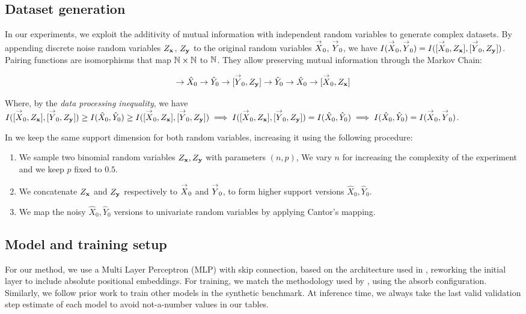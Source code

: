 \subsection{Dataset generation}\label{sec:isomorphisms}
In our experiments, we exploit the additivity of mutual information with independent random variables to generate complex datasets. By appending discrete noise random variables $Z_{\mathbf{x}}$, $Z_{\mathbf{y}}$ to the original random variables $\overset{\rightarrow}{X}_0$, $\overset{\rightarrow}{Y}_0$, we have $I(\overset{\rightarrow}{X}_0,\overset{\rightarrow}{Y}_0) = I([\overset{\rightarrow}{X}_0, Z_{\mathbf{x}}],[\overset{\rightarrow}{Y}_0, Z_{\mathbf{y}}])$. Pairing functions are isomorphisms that map ${\mathbb{N}}\times{\mathbb{N}}$ to ${\mathbb{N}}$. They allow preserving mutual information through the Markov Chain:

\begin{equation}
    [\fproc_0,Z_\rvx] \to \hat{X}_0 \to \hat{Y}_0 \to [\fprocy_0,Z_\rvy] \to \hat{Y}_0 \to \hat{X}_0 \to [\fproc_0,Z_\rvx]
\end{equation}

Where, by the \textit{data processing inequality}, we have $I([\overset{\rightarrow}{X}_0,Z_{\mathbf{x}}],[\overset{\rightarrow}{Y}_0,Z_{\mathbf{y}}]) \geq I(\hat{X}_0,\hat{Y}_0) \geq I([\overset{\rightarrow}{X}_0,Z_{\mathbf{x}}],[\overset{\rightarrow}{Y}_0,Z_{\mathbf{y}}]) \implies I([\overset{\rightarrow}{X}_0,Z_{\mathbf{x}}],[\overset{\rightarrow}{Y}_0,Z_{\mathbf{y}}]) = I(\hat{X}_0,\hat{Y}_0) \implies I(\hat{X}_0,\hat{Y}_0) = I(\overset{\rightarrow}{X}_0,\overset{\rightarrow}{Y}_0)$.

In  we keep the same support dimension for both random variables, increasing it using the following procedure:
\begin{enumerate}
    \item We sample two binomial random variables $Z_{\mathbf{x}},Z_{\mathbf{y}}$ with parameters $(n,p)$, %
    We vary $n$ for increasing the complexity of the experiment and we keep $p$ fixed to $0.5$.
    \item We concatenate $Z_{\mathbf{x}}$ and $Z_{\mathbf{y}}$ respectively to $\overset{\rightarrow}{X}_0$ and $\overset{\rightarrow}{Y}_0$, to form higher support versions $\hat{X}_0,\hat{Y}_0$.
    \item We map the noisy $\hat{X}_0,\hat{Y}_0$ versions to univariate random variables by applying Cantor's mapping.
\end{enumerate}

\subsection{Model and training setup}\label{sec:training_details} For our method, we use a Multi Layer Perceptron (MLP) with skip connection, based on the architecture used in \cite{franzese2023minde}, reworking the initial layer to include absolute positional embeddings. For training, we match the methodology used by \cite{lou2024discrete}, using the absorb configuration. Similarly, we follow prior work to train other models in the synthetic benchmark. At inference time, we always take the last valid validation step estimate of each model to avoid not-a-number values in our tables.


